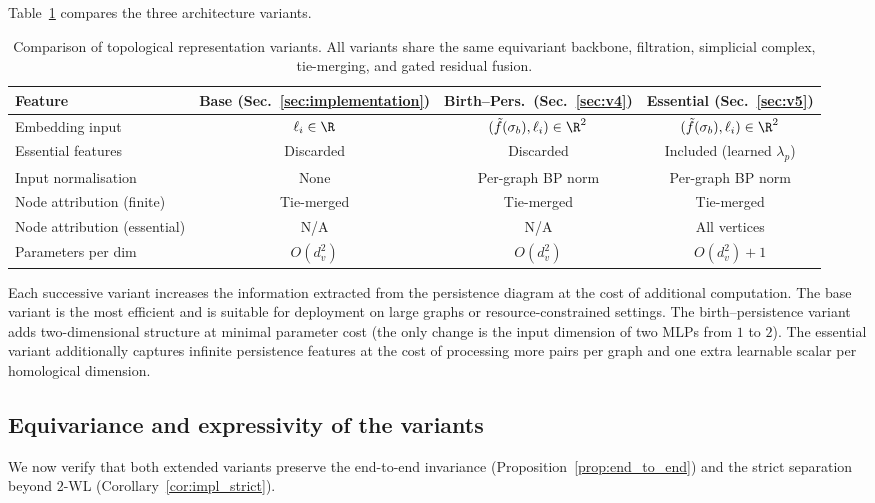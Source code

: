Table~\ref{tab:variants} compares the three architecture variants.

\begin{table}[h]
\centering
\caption{Comparison of topological representation variants. All variants share the same equivariant backbone, filtration, simplicial complex, tie-merging, and gated residual fusion.}
\label{tab:variants}
\begin{tabular}{lccc}
\toprule
\textbf{Feature} & \textbf{Base (Sec.~\ref{sec:implementation})} & \textbf{Birth--Pers.\ (Sec.~\ref{sec:v4})} & \textbf{Essential (Sec.~\ref{sec:v5})} \\
\midrule
Embedding input & $\ell_i \in \R$ & $(\tilde{f}(\sigma_b), \ell_i) \in \R^2$ & $(\tilde{f}(\sigma_b), \ell_i) \in \R^2$ \\
Essential features & Discarded & Discarded & Included (learned $\lambda_p$) \\
Input normalisation & None & Per-graph BP norm & Per-graph BP norm \\
Node attribution (finite) & Tie-merged & Tie-merged & Tie-merged \\
Node attribution (essential) & N/A & N/A & All vertices \\
Parameters per dim & $O(d_v^2)$ & $O(d_v^2)$ & $O(d_v^2) + 1$ \\
\bottomrule
\end{tabular}
\end{table}

Each successive variant increases the information extracted from the persistence diagram at the cost of additional computation. The base variant is the most efficient and is suitable for deployment on large graphs or resource-constrained settings. The birth--persistence variant adds two-dimensional structure at minimal parameter cost (the only change is the input dimension of two MLPs from $1$ to $2$). The essential variant additionally captures infinite persistence features at the cost of processing more pairs per graph and one extra learnable scalar per homological dimension.


\subsection{Equivariance and expressivity of the variants}

We now verify that both extended variants preserve the end-to-end invariance (Proposition~\ref{prop:end_to_end}) and the strict separation beyond $2$-WL (Corollary~\ref{cor:impl_strict}).

